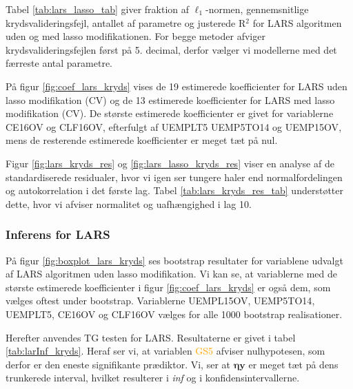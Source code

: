
Tabel \ref{tab:lars_lasso_tab} giver fraktion af \(\ell_1\)-normen, gennemsnitlige krydsvalideringsfejl, antallet af parametre og justerede R$^2$ for LARS algoritmen uden og med lasso modifikationen. 
For begge metoder afviger krydsvalideringsfejlen først på 5. decimal, derfor vælger vi modellerne med det færreste antal parametre. 
%

%
På figur \ref{fig:coef_lars_kryds} vises de 19 estimerede koefficienter for LARS uden lasso modifikation (CV) og de 13 estimerede koefficienter for LARS med lasso modifikation (CV). 
De største estimerede koefficienter er givet for variablerne \textcolor{blue3}{CE16OV} og \textcolor{blue3}{CLF16OV}, efterfulgt af \textcolor{blue3}{UEMPLT5} \textcolor{blue3}{UEMP5TO14} og \textcolor{blue3}{UEMP15OV}, mens de resterende estimerede koefficienter er meget tæt på nul. 


Figur \ref{fig:lars_kryds_res} og \ref{fig:lars_lasso_kryds_res} viser en analyse af de standardiserede residualer, hvor vi igen ser tungere haler end normalfordelingen og autokorrelation i det første lag. 
Tabel \ref{tab:lars_kryds_res_tab} understøtter dette, hvor vi afviser normalitet og uafhængighed i lag 10. 

\newpage
\subsubsection{Inferens for LARS}
På figur \ref{fig:boxplot_lars_kryds} ses bootstrap resultater for variablene udvalgt af LARS algoritmen uden lasso modifikation. 
Vi kan se, at variablerne med de største estimerede koefficienter i figur \ref{fig:coef_lars_kryds} er også dem, som vælges oftest under bootstrap. 
Variablerne \textcolor{blue3}{UEMPL15OV}, \textcolor{blue3}{UEMP5TO14}, \textcolor{blue3}{UEMPLT5}, \textcolor{blue3}{CE16OV} og \textcolor{blue3}{CLF16OV} vælges for alle 1000 bootstrap realisationer.


Herefter anvendes TG testen for LARS.
Resultaterne er givet i tabel \ref{tab:larInf_kryds}.
Heraf ser vi, at variablen \textcolor{orange}{GS5} afviser nulhypotesen, som derfor er den eneste signifikante prædiktor. 
Vi, ser at $\boldsymbol{\eta} \textbf{y}$ er meget tæt på dens trunkerede interval, hvilket resulterer i \textit{inf} og  i konfidensintervallerne.  


